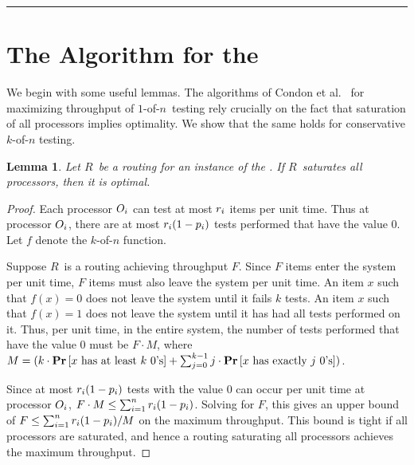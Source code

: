 \documentclass{article}
\newcounter{thmcount}
\newtheorem{lem}[thmcount]{Lemma}
\newcommand{\ens}[1]{\ensuremath{#1}}					\newcommand{\card}[1]{\ens{|#1|}}							\newcommand{\dotlist}[2]{\ens{#1,\ldots,#2}}
\newcommand{\anitem}{\ens{x}}
\newcommand{\valn}{\ens{n}}
\newcommand{\valk}{\ens{k}}
\newcommand{\kofn}{\valk-of-\valn}
\newcommand{\oneofn}{$1$-of-\valn}
\newcommand{\strategy}{\ens{T}}
\newcommand{\thruput}{\ens{F}}
\newcommand{\kfunc}{\ens{f}}                                                      \newcommand{\stratspace}{\ens{\mathcal{\strategy}}}		\newcommand{\stratspacec}{\ens{\mathcal{\strategy}_c}}	\newcommand{\perm}{\ens{\pi}}										\newcommand{\loadratio}{\ens{M}}									\newcommand{\flowamt}{\ens{m}}									\newcommand{\routing}{\ens{R}}										\newcommand{\commonr}{\ens{r}}                                                                                                      \newcommand{\unsat}{\ens{L}}											\newcommand{\satsuff}{\ens{Q}}										\newcommand{\vecy}{\ens{y}}
\newcommand{\processor}{processor}
\newcommand{\probgen}[1]{\ens{\mathbf{Pr}\left[#1\right]}}
\begin{document}
\vspace{6pt}
\hrule
\vspace{10pt}








\section{The Algorithm for the \cmt}

We begin with some useful lemmas.
The algorithms of Condon et al.~\cite{journals/talg/CondonDHW09} for maximizing throughput
of \oneofn\ testing rely crucially on the fact that saturation
of all {\processor}s implies optimality.  
We show that the same holds for conservative \kofn{} testing.

\begin{lem}
Let \routing\ be a routing for an instance of the \cmt.  If \routing\ saturates all {\processor}s, then it is optimal.
\end{lem}

\begin{proof}
Each {\processor} $\op i$ can test at most $\rate i$ items per unit time.
Thus at {\processor} $\op i$, there are at most $\rate i (1-\pr i)$ tests 
performed that have the value 0.
Let $\kfunc$ denote the \kofn{} function.

Suppose \routing\ is a routing achieving throughput $\thruput$.
Since $\thruput$ items enter the system per unit time, 
$\thruput$ items must also leave the system per unit time.
An item \anitem{} such that $\kfunc(x) = 0$ does not leave the system until it fails $\valk$ tests.
An item \anitem{} such that $\kfunc(x) = 1$ does not leave the system until it has had all
tests performed on it.
Thus, per unit time,
in the entire system,
the number of tests performed that have the
value 0 must be $\thruput \cdot \loadratio$, where $\loadratio = (k\cdot \probgen{\mbox{\anitem{} has at least $\valk$ 0's}} + \sum_{j = 0}^{k-1}j\cdot \probgen{\mbox{\anitem{} has exactly $j$ 0's}})$. 

Since at most $\rate i (1-\pr i)$ tests 
with the value 0 can occur per unit time at {\processor} $\op i$,
$\thruput \cdot \loadratio \leq \sum_{i=1}^n \rate i (1-\pr i)$.
Solving for $\thruput$, this gives an upper bound of
$\thruput \leq \sum_{i=1}^n \rate i (1-\pr i)/ \loadratio$
on the maximum throughput.  This bound is tight if
all {\processor}s are saturated, and hence a routing saturating
all {\processor}s achieves the maximum throughput.
\end{proof}
\end{document}
